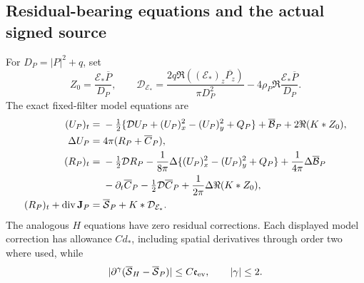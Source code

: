 \subsection{Residual-bearing equations and the actual signed source}
\begin{proposition}
\label{prop:positive-residual-equations}
For $D_P=|P|^2+q$, set
\begin{equation}
 Z_0=\frac{\mathcal E_*\overline P}{D_P},\qquad
 \mathcal D_{\mathcal E_*}
 =\frac{2q\Re((\mathcal E_*)_z\overline{P_z})}{\pi D_P^2}
     -4\rho_P\Re\frac{\mathcal E_*\overline P}{D_P}.
 \label{eq:positive-residual-density-correction}
\end{equation}
The exact fixed-filter model equations are
\begin{align}
 (U_P)_t={}&-\tfrac12\{\mathcal D U_P+(U_P)_x^2-(U_P)_y^2+Q_P\}
       +\overline{\mathcal B}_P+2\Re(K*Z_0),\notag\\
 \Delta U_P={}&4\pi(R_P+\overline C_P),
 \label{eq:positive-residual-potential-equation}\\
 (R_P)_t={}&-\tfrac12\mathcal D R_P
 -\frac1{8\pi}\Delta\{(U_P)_x^2-(U_P)_y^2+Q_P\}
 +\frac1{4\pi}\Delta\overline{\mathcal B}_P\notag\\
 &-\partial_t\overline C_P-\tfrac12\mathcal D\overline C_P
                    +\frac1{2\pi}\Delta\Re(K*Z_0),
 \label{eq:positive-residual-density-equation}\\
 (R_P)_t+\operatorname{div}\mathbf J_P
 ={}&\overline{\mathcal S}_P+K*\mathcal D_{\mathcal E_*}.
 \label{eq:positive-residual-current-equation}
\end{align}
The analogous $H$ equations have zero residual corrections.
Each displayed model correction has allowance $Cd_*$, including spatial
derivatives through order two where used, while
\begin{equation}
 |\partial^\gamma(\overline{\mathcal S}_H
                  -\overline{\mathcal S}_P)|
 \le C\mathfrak e_{\rm ev},\qquad |\gamma|\le2.
 \label{eq:positive-signed-source-bound}
\end{equation}
\end{proposition}
